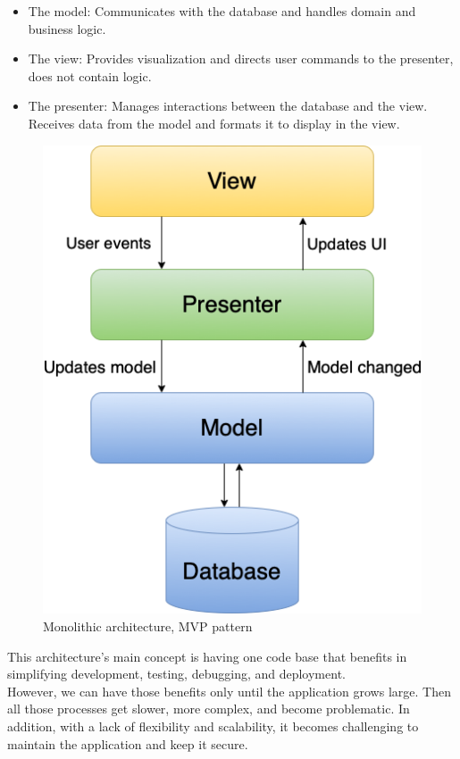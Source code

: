 \begin{itemize}
  \item The model: Communicates with the database and handles domain and business logic.
  \item The view: Provides visualization and directs user commands to the presenter, does not contain logic.
  \item The presenter: Manages interactions between the database and the view. Receives data from the model and formats it to display in the view.
\end{itemize}

\begin{figure}[hp]
\centering
\includegraphics[scale=0.52]{../png/mvp_monolithic.png}
\caption{Monolithic architecture, MVP pattern}\label{picture:mvp}
\end{figure}

\noindent This architecture's main concept is having one code base that benefits in \\ simplifying development, testing, debugging, and deployment. \\
However, we can have those benefits only until the application grows large. Then all those processes get slower, more complex, and become problematic. In addition, with a lack of flexibility and scalability, it becomes challenging to maintain the application and keep it secure. \\

